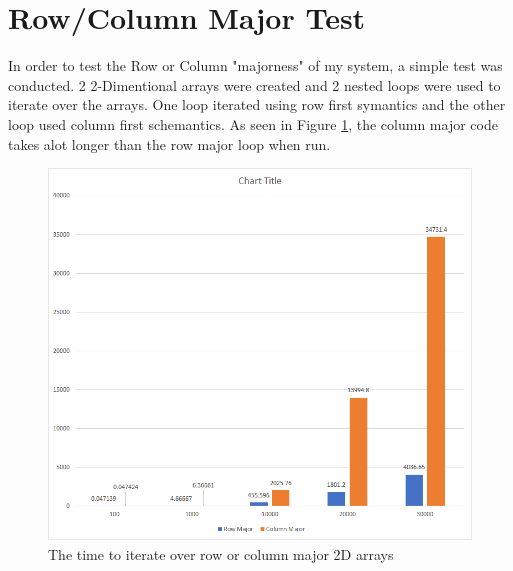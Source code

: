 \documentclass{article}
\begin{document}
	\section{Row/Column Major Test}
		In order to test the Row or Column "majorness" of my system, a simple test was conducted. 2 2-Dimentional arrays were created and 2 nested loops were used to iterate over the arrays. One loop iterated using row first symantics and the other loop used column first schemantics. As seen in Figure \ref{rc:res_graph}, the column major code takes alot longer than the row major loop when run.
		\begin{figure}[H]
			\label{rc:res_graph}
			\centering
			\includegraphics{res_graph.png}
			\caption{The time to iterate over row or column major 2D arrays}
		\end{figure}
\end{document}
